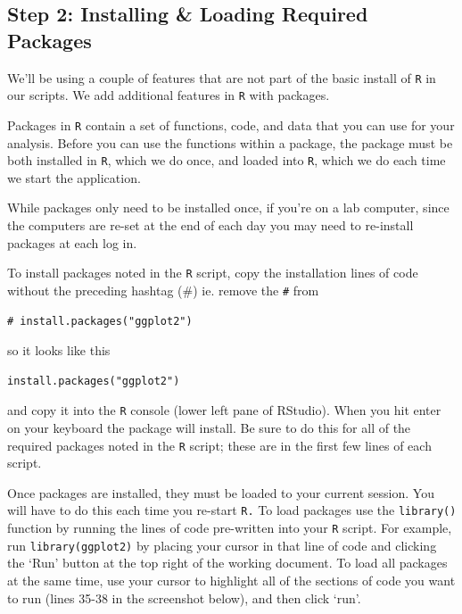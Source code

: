 \documentclass[
]{book}
\begin{document}
\hypertarget{step-2-installing-loading-required-packages}{%
\subsection*{Step 2: Installing \& Loading Required Packages}\label{step-2-installing-loading-required-packages}}

We'll be using a couple of features that are not part of the basic install of \texttt{R} in our scripts. We add additional features in \texttt{R} with packages.

Packages in \texttt{R} contain a set of functions, code, and data that you can use for your analysis. Before you can use the functions within a package, the package must be both installed in \texttt{R}, which we do once, and loaded into \texttt{R}, which we do each time we start the application.

While packages only need to be installed once, if you're on a lab computer, since the computers are re-set at the end of each day you may need to re-install packages at each log in.

To install packages noted in the \texttt{R} script, copy the installation lines of code without the preceding hashtag (\#) ie. remove the \texttt{\#} from

\begin{verbatim}
# install.packages("ggplot2")
\end{verbatim}

so it looks like this

\begin{verbatim}
install.packages("ggplot2")
\end{verbatim}

and copy it into the \texttt{R} console (lower left pane of RStudio). When you hit enter on your keyboard the package will install. Be sure to do this for all of the required packages noted in the \texttt{R} script; these are in the first few lines of each script.

Once packages are installed, they must be loaded to your current session. You will have to do this each time you re-start \texttt{R.} To load packages use the \texttt{library()} function by running the lines of code pre-written into your \texttt{R} script. For example, run \texttt{library(ggplot2)} by placing your cursor in that line of code and clicking the `Run' button at the top right of the working document. To load all packages at the same time, use your cursor to highlight all of the sections of code you want to run (lines 35-38 in the screenshot below), and then click `run'.
\end{document}
